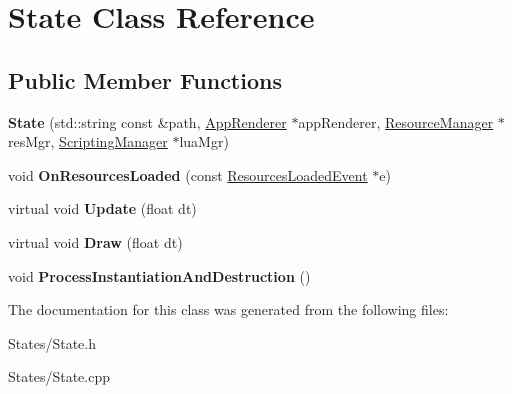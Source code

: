 \hypertarget{classState}{}\section{State Class Reference}
\label{classState}
\subsection*{Public Member Functions}
\begin{DoxyCompactItemize}
\item 
\mbox{\label{classState_a935578b20d60c6ed193e96ceec1201be}} 
{\bfseries State} (std\+::string const \&path, \hyperlink{classAppRenderer}{App\+Renderer} $\ast$app\+Renderer, \hyperlink{classResourceManager}{Resource\+Manager} $\ast$res\+Mgr, \hyperlink{classScriptingManager}{Scripting\+Manager} $\ast$lua\+Mgr)
\item 
\mbox{\label{classState_a5c3567e3ce68f000e96901099c92eda5}} 
void {\bfseries On\+Resources\+Loaded} (const \hyperlink{classResourcesLoadedEvent}{Resources\+Loaded\+Event} $\ast$e)
\item 
\mbox{\label{classState_a1660e74611d9e044a136bea1f96b8f8b}} 
virtual void {\bfseries Update} (float dt)
\item 
\mbox{\label{classState_aacc5a196dc56e926051517bb0eb86f7c}} 
virtual void {\bfseries Draw} (float dt)
\item 
\mbox{\label{classState_ad0fd1771625e07bcddaf2dc7a52a5b19}} 
void {\bfseries Process\+Instantiation\+And\+Destruction} ()
\end{DoxyCompactItemize}


The documentation for this class was generated from the following files\+:\begin{DoxyCompactItemize}
\item 
States/State.\+h\item 
States/State.\+cpp\end{DoxyCompactItemize}
